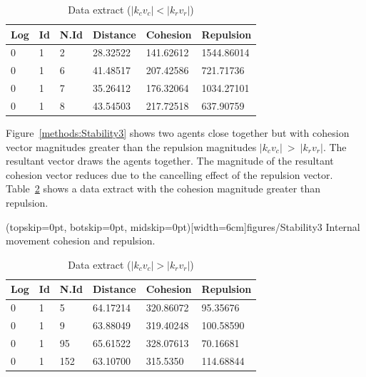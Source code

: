 \documentclass{ieeeaccess}
\begin{document}
\begin{table}[H]
\begin{center}
\begin{tabular}{| l | l | l | l | l | l |}
\hline
Log &	Id &	N.Id &	Distance &	{\color{green}Cohesion} &	{\color{red}Repulsion} 	\\ \hline
0 & 1 & 2 & 28.32522 & {\color{green}141.62612} & {\color{red}1544.86014} \\ \hline
0 & 1 & 6 & 41.48517 & {\color{green}207.42586} & {\color{red}721.71736} \\ \hline
0 & 1 & 7 & 35.26412 & {\color{green}176.32064} & {\color{red}1034.27101} \\ \hline
0 & 1 & 8 & 43.54503 & {\color{green}217.72518} & {\color{red}637.90759} \\
\hline
\end{tabular}\caption{Data extract ($|k_cv_c| < |k_rv_r|$)} \label{tab:SampleReplusionPositive}
\end{center}
\end{table}

Figure~\ref{methods:Stability3} shows two agents close together but with
cohesion vector magnitudes greater than the repulsion magnitudes
$|k_cv_c|~>~|k_rv_r|$. The resultant vector draws the agents together. The
magnitude of the resultant cohesion vector reduces due to the cancelling effect
of the repulsion vector. Table~\ref{tab:SampleCohesionPositive} shows a data
extract with the cohesion magnitude greater than repulsion.

\Figure[t!](topskip=0pt, botskip=0pt,
midskip=0pt)[width=6cm]{figures/Stability3} {Internal movement cohesion and
repulsion.\label{methods:Stability3}}


\begin{table}[H]
\begin{center}
\begin{tabular}{| l | l | l | l | l | l |}
\hline
Log &	Id &	N.Id &	Distance &	{\color{green}Cohesion} & {\color{red}Repulsion} 	\\ \hline
0 & 1 & 5 &	64.17214 &	{\color{green}320.86072} &	{\color{red}95.35676} \\ \hline
0 & 1 & 9 &	63.88049 &	{\color{green}319.40248} &	{\color{red}100.58590} \\ \hline
0 & 1 & 95 & 65.61522 &	{\color{green}328.07613} &	{\color{red}70.16681} \\ \hline
0 & 1 & 152 & 63.10700 & {\color{green}315.5350} & {\color{red}114.68844} \\ 
\hline
\end{tabular}\caption{Data extract ($|k_cv_c| > |k_rv_r|$)} \label{tab:SampleCohesionPositive}
\end{center}
\end{table}
\end{document}

